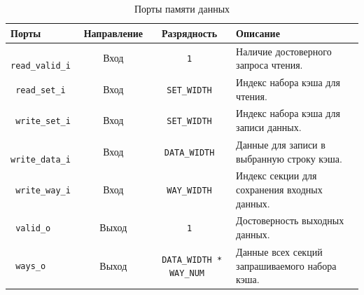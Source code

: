 \begin{table}[htbp]
	\centering
	\label{tab:data_memory_ports}
	\small
	\begin{tabularx}{\textwidth}{l c c X}
		\toprule
		\textbf{Порты} & \textbf{Направление} & \textbf{Разрядность} & \textbf{Описание} \\
		\midrule
		\verb| read_valid_i | & Вход & \verb| 1 | & Наличие достоверного запроса чтения. \\
		\verb| read_set_i | & Вход & \verb| SET_WIDTH | & Индекс набора кэша для чтения. \\
		\verb| write_set_i | & Вход & \verb| SET_WIDTH | & Индекс набора кэша для записи данных. \\
		\verb| write_data_i | & Вход & \verb| DATA_WIDTH | & Данные для записи в выбранную строку кэша. \\
		\verb| write_way_i | & Вход & \verb| WAY_WIDTH | & Индекс секции для сохранения входных данных. \\
		\verb| valid_o | & Выход & \verb| 1 | & Достоверность выходных данных. \\
		\verb| ways_o | & Выход & \verb| DATA_WIDTH * WAY_NUM | & Данные всех секций запрашиваемого набора кэша. \\
		\bottomrule
	\end{tabularx}
	\caption{Порты памяти данных}
\end{table}

